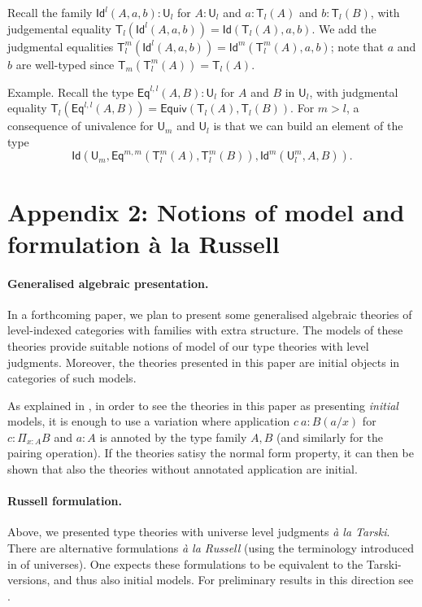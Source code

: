 \documentclass[a4paper,UKenglish,cleveref, autoref, thm-restate]{lipics-v2021}
\newcommand{\Id}{\mathsf{Id}}
\newcommand{\Eq}{\mathsf{Eq}}
\newcommand{\UU}{\mathsf{U}}
\newcommand{\mypi}[3]{\Pi_{#1:#2}#3}
\newcommand{\T}{\mathsf{T}}
\newcommand{\Equiv}{\mathsf{Equiv}}
\begin{document}
Recall the family $\Id^l(A,a,b):\UU_l$ for $A:\UU_l$
and $a:\T_l(A)$ and $b:\T_l(B)$, with
judgemental equality $\T_l(\Id^l(A,a,b)) = \Id(\T_l(A),a,b)$.
We add the judgmental equalities $\T_l^m(\Id^l(A,a,b)) =
\Id^m(\T_l^m(A),a,b)$; note that $a$ and $b$ are well-typed since
$\T_{m}(\T_{l}^{m}(A)) = \T_{l}(A)$.

\medskip

Example. Recall the type $\Eq^{l,l}(A,B):\UU_l$ for $A$ and $B$ in $\UU_l$,
with judgmental equality
$\T_l(\Eq^{l,l}(A,B)) = \Equiv(\T_l(A),\T_l(B))$.
For $m>l$, a consequence of univalence
for $\UU_m$ and $\UU_l$ is that we can build an element of the type
$$
\Id(\UU_m,\Eq^{m,m}(\T^m_l(A),\T^m_l(B)),\Id^m(\UU^m_l,A,B)).
$$

\section*{Appendix 2: Notions of model and formulation \`a la Russell}

\paragraph{Generalised algebraic presentation.}

In a forthcoming paper, we plan to present some generalised algebraic theories of level-indexed categories with families with extra structure.  The models of these theories provide suitable notions of model of our type theories with level judgments. Moreover, the theories presented in this paper are initial objects in categories of such models.
\begin{remark} \label{app:annotation}
As explained
in \cite{streicher:semtt}, in order to see the theories in this paper as presenting {\em initial} models,
it is enough to use a variation where application $c~a:B(a/x)$ for $c:\mypi{x}{A}B$ and $a:A$
is annoted by the type family $A,B$ (and similarly for the pairing operation). If the theories satisy the normal form property, it can then be shown that also the theories without annotated application are initial.
\end{remark}


\paragraph{Russell formulation.}
Above, we presented type theories with universe level judgments {\em \`a la Tarski}. There are alternative formulations
{\em \`a la Russell} (using the terminology introduced in
\cite{martinlof:padova} of
universes). One expects these formulations to be equivalent to the Tarski-versions, and thus also initial models. For preliminary results in this
direction see \cite{Assaf14,Thire20}.
\end{document}
